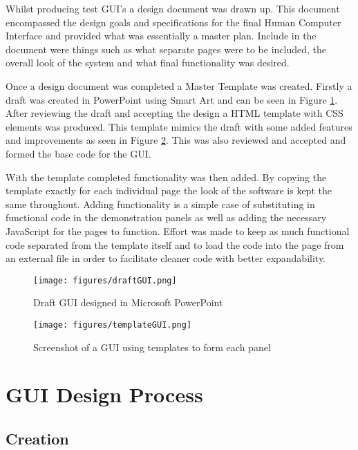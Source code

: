 Whilst producing test GUI's a design document was drawn up.  This document encompassed the design goals and specifications for the final Human Computer Interface and provided what was essentially a master plan.  Include in the document were things such as what separate pages were to be included, the overall look of the system and what final functionality was desired.  


Once a design document was completed a Master Template was created.  Firstly a draft was created in PowerPoint using Smart Art and can be seen in Figure \ref{draftGUI.png}.  After reviewing the draft and accepting the design a  HTML template with CSS elements was produced.  This template mimics the draft with some added features and improvements as seen in Figure \ref{templateGUI.png}.  This was also reviewed and accepted and formed the base code for the GUI.

	With the template completed functionality was then added.  By copying the template exactly for each individual page the look of the software is kept the same throughout.  Adding functionality is a simple case of substituting in functional code in the demonstration panels as well as adding the necessary JavaScript for the pages to function.  Effort was made to keep as much functional code separated from the template itself and to load the code into the page from an external file in order to facilitate cleaner code with better expandability.

\begin{figure}[H]
	\centering
	\texttt{[image: figures/draftGUI.png]}
	\caption{Draft GUI designed in Microsoft PowerPoint} 
	\label{draftGUI.png}
\end{figure}

\begin{figure}[H]
	\centering
	\texttt{[image: figures/templateGUI.png]}
	\caption{Screenshot of a GUI using templates to form each panel} 
	\label{templateGUI.png}
\end{figure}



\section{GUI Design Process}\label{GUI Design Process}

\subsection{Creation}

